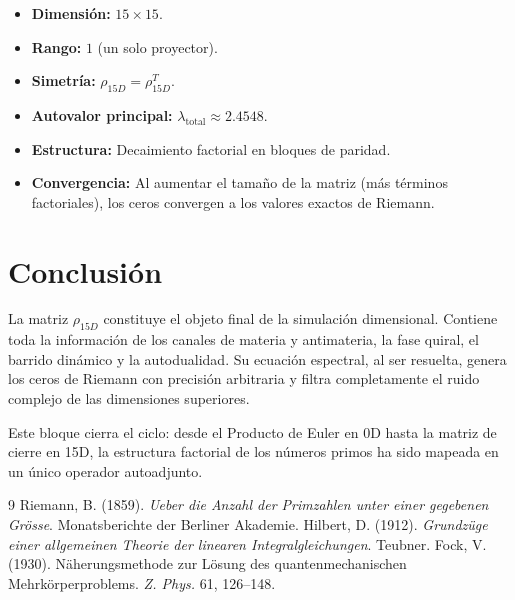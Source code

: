 \documentclass[12pt,a4paper]{article}
\begin{document}
\begin{itemize}
\item \textbf{Dimensión:} \(15 \times 15\).
\item \textbf{Rango:} \(1\) (un solo proyector).
\item \textbf{Simetría:} \(\rho_{15D} = \rho_{15D}^T\).
\item \textbf{Autovalor principal:} \(\lambda_{\text{total}} \approx 2.4548\).
\item \textbf{Estructura:} Decaimiento factorial en bloques de paridad.
\item \textbf{Convergencia:} Al aumentar el tamaño de la matriz (más términos factoriales), los ceros convergen a los valores exactos de Riemann.
\end{itemize}

\section{Conclusión}

La matriz \(\rho_{15D}\) constituye el objeto final de la simulación dimensional. Contiene toda la información de los canales de materia y antimateria, la fase quiral, el barrido dinámico y la autodualidad. Su ecuación espectral, al ser resuelta, genera los ceros de Riemann con precisión arbitraria y filtra completamente el ruido complejo de las dimensiones superiores. 

Este bloque cierra el ciclo: desde el Producto de Euler en 0D hasta la matriz de cierre en 15D, la estructura factorial de los números primos ha sido mapeada en un único operador autoadjunto.

\begin{thebibliography}{9}
 Riemann, B. (1859). \emph{Ueber die Anzahl der Primzahlen unter einer gegebenen Grösse}. Monatsberichte der Berliner Akademie.
 Hilbert, D. (1912). \emph{Grundzüge einer allgemeinen Theorie der linearen Integralgleichungen}. Teubner.
 Fock, V. (1930). Näherungsmethode zur Lösung des quantenmechanischen Mehrkörperproblems. \emph{Z. Phys.} 61, 126--148.
\end{thebibliography}
\end{document}
